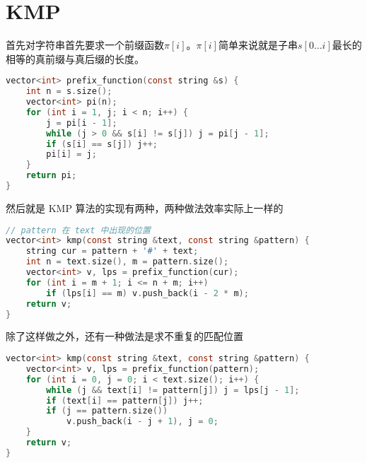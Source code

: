 \section{KMP}

首先对字符串首先要求一个前缀函数$\pi[i]$。$\pi[i]$简单来说就是子串$s[0\dots i]$最长的相等的真前缀与真后缀的长度。

\begin{lstlisting}[language = c]
vector<int> prefix_function(const string &s) {
    int n = s.size();
    vector<int> pi(n);
    for (int i = 1, j; i < n; i++) {
        j = pi[i - 1];
        while (j > 0 && s[i] != s[j]) j = pi[j - 1];
        if (s[i] == s[j]) j++;
        pi[i] = j;
    }
    return pi;
}
\end{lstlisting}

然后就是 KMP 算法的实现有两种，两种做法效率实际上一样的

\begin{lstlisting}[language = c]
// pattern 在 text 中出现的位置
vector<int> kmp(const string &text, const string &pattern) {
    string cur = pattern + '#' + text;
    int n = text.size(), m = pattern.size();
    vector<int> v, lps = prefix_function(cur);
    for (int i = m + 1; i <= n + m; i++)
        if (lps[i] == m) v.push_back(i - 2 * m);
    return v;
}
\end{lstlisting}

除了这样做之外，还有一种做法是求不重复的匹配位置

\begin{lstlisting}[language = c]
vector<int> kmp(const string &text, const string &pattern) {
    vector<int> v, lps = prefix_function(pattern);
    for (int i = 0, j = 0; i < text.size(); i++) {
        while (j && text[i] != pattern[j]) j = lps[j - 1];
        if (text[i] == pattern[j]) j++;
        if (j == pattern.size())
            v.push_back(i - j + 1), j = 0;
    }
    return v;
}
\end{lstlisting}